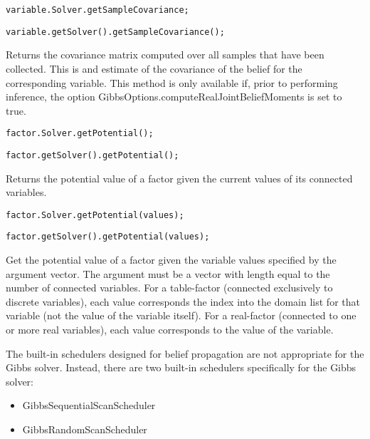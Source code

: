 \ifmatlab
\begin{lstlisting}
variable.Solver.getSampleCovariance;
\end{lstlisting}
\fi

\ifjava
\begin{lstlisting}
variable.getSolver().getSampleCovariance();
\end{lstlisting}
\fi

Returns the covariance matrix computed over all samples that have been collected.  This is and estimate of the covariance of the belief for the corresponding variable.  This method is only available if, prior to performing inference, the option GibbsOptions.computeRealJointBeliefMoments is set to true.


\ifmatlab
\begin{lstlisting}
factor.Solver.getPotential();
\end{lstlisting}
\fi

\ifjava
\begin{lstlisting}
factor.getSolver().getPotential();
\end{lstlisting}
\fi

Returns the potential value of a factor given the current values of its connected variables.

\ifmatlab
\begin{lstlisting}
factor.Solver.getPotential(values);
\end{lstlisting}
\fi

\ifjava
\begin{lstlisting}
factor.getSolver().getPotential(values);
\end{lstlisting}
\fi

Get the potential value of a factor given the variable values specified by the argument vector. The argument must be a vector with length equal to the number of connected variables. For a table-factor (connected exclusively to discrete variables), each value corresponds the index into the domain list for that variable (not the value of the variable itself). For a real-factor (connected to one or more real variables), each value corresponds to the value of the variable.


The built-in schedulers designed for belief propagation are not appropriate for the Gibbs solver.  Instead, there are two built-in schedulers specifically for the Gibbs solver:

\begin{itemize}
\item GibbsSequentialScanScheduler
\item GibbsRandomScanScheduler
\end{itemize}


